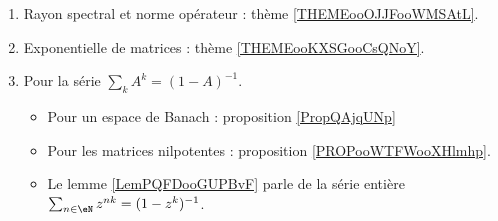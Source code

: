        \label{THEMEooPQKDooTAVKFH}


\begin{enumerate}
    \item
        Rayon spectral et norme opérateur : thème \ref{THEMEooOJJFooWMSAtL}.
    \item
        Exponentielle de matrices : thème \ref{THEMEooKXSGooCsQNoY}.
    \item
        Pour la série \( \sum_kA^k=(1-A)^{-1}\).
        \begin{itemize}
            \item Pour un espace de Banach : proposition \ref{PropQAjqUNp}
            \item Pour les matrices nilpotentes : proposition \ref{PROPooWTFWooXHlmhp}.
            \item Le lemme \ref{LemPQFDooGUPBvF} parle de la série entière \( \sum_{n\in \eN}z^{nk}=(1-z^k)^{-1}\).
        \end{itemize}
\end{enumerate}
